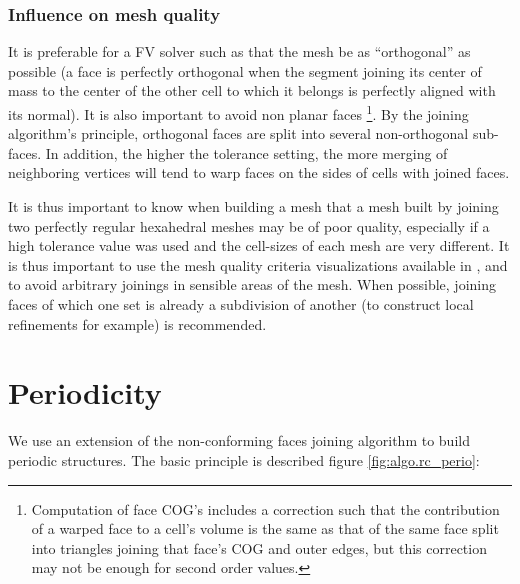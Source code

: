 \subsubsection{Influence on mesh quality\label{sec:join.quality}}

It is preferable for a FV solver such as \CS that the mesh be as
``orthogonal'' as possible (a face is perfectly orthogonal when the
segment joining its center of mass to the center of the other cell to
which it belongs is perfectly aligned with its normal).
It is also important to avoid non planar faces
\footnote {Computation of face COG's includes a correction such that
the contribution of a warped face to a cell's volume is the same
as that of the same face split into triangles joining that face's
COG and outer edges, but this correction may not be enough
for second order values.}.
By the joining algorithm's principle, orthogonal faces are split
into several non-orthogonal sub-faces. In addition, the higher
the tolerance setting, the more merging of neighboring vertices
will tend to warp faces on the sides of cells with joined faces.

It is thus important to know when building a mesh that a mesh
built by joining two perfectly regular hexahedral meshes may
be of poor quality, especially if a high tolerance value
was used and the cell-sizes of each mesh are very different.
It is thus important to use the mesh quality criteria visualizations
available in \CS, and to avoid arbitrary joinings in sensible
areas of the mesh. When possible, joining faces of which one
set is already a subdivision of another (to construct local
refinements for example) is recommended.

\section{Periodicity\label{sec:algo.perio}}

We use an extension of the non-conforming faces joining algorithm
to build periodic structures. The basic principle is described
figure \ref{fig:algo.rc_perio}:


